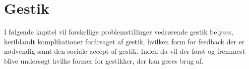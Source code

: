 \chapter{Gestik}
\label{Gestik}
%
I følgende kapitel vil forskellige problemstillinger vedrørende gestik belyses, heriblandt komplikationer forårsaget af gestik, hvilken form for feedback der er nødvendig samt den sociale accept af gestik. Inden da vil der først og fremmest blive undersøgt hvilke former for gestikker, der kan gøres brug af.  
%
